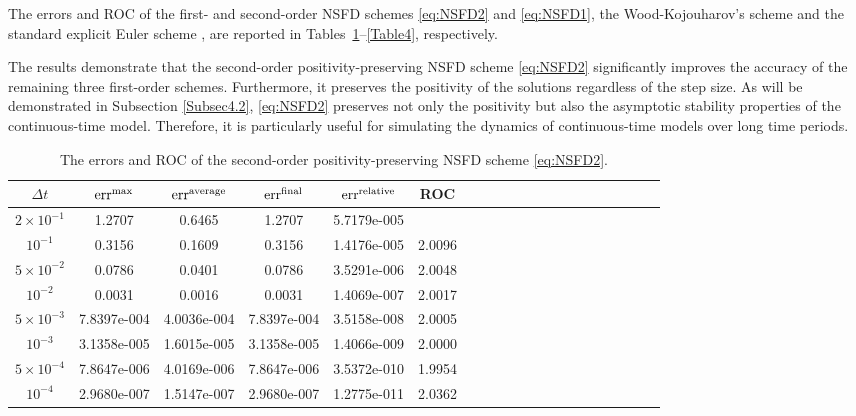 \documentclass[11pt]{article}
\theoremstyle{definition}
\theoremstyle{remark}
\numberwithin{equation}{section}
\DeclareMathOperator{\err}{err}
\begin{document}
The errors and ROC of the first- and second-order NSFD schemes \eqref{eq:NSFD2} and \eqref{eq:NSFD1}, the Wood-Kojouharov's scheme \cite{Wood1} and the standard explicit Euler scheme \cite{Ascher, Stuart}, are reported in Tables~\ref{Table1}--\ref{Table4}, respectively.

The results demonstrate that the second-order positivity-preserving NSFD scheme \eqref{eq:NSFD2} significantly improves the accuracy of the remaining three first-order schemes. 
Furthermore, it preserves the positivity of the solutions regardless of the step size. 
As will be demonstrated in Subsection \ref{Subsec4.2}, \eqref{eq:NSFD2} preserves not only the positivity but also the asymptotic stability properties of the continuous-time model. 
Therefore, it is particularly useful for simulating the dynamics of continuous-time models over long time periods.
\begin{table}[htb]
\centering
\caption{The errors and ROC of the second-order positivity-preserving NSFD scheme \eqref{eq:NSFD2}.}\label{Table1}
\begin{tabular}{cccccccccccccccccccc}
\hline
$\Delta t$ & $\err^{\rm max}$ & $\err^{\rm average}$ & $\err^{\rm final}$ & $\err^{\rm relative}$ & ROC \\
\hline
$2 \times 10^{-1}$ & 1.2707 & 0.6465 & 1.2707 & 5.7179e-005 &\\
$10^{-1}$& 0.3156 & 0.1609 & 0.3156 & 1.4176e-005 & 2.0096\\
$5 \times 10^{-2} $ & 0.0786 &  0.0401 & 0.0786 & 3.5291e-006 & 2.0048 \\
$10^{-2}$ & 0.0031 &  0.0016 & 0.0031 & 1.4069e-007 & 2.0017\\
$5 \times 10^{-3}$ & 7.8397e-004 & 4.0036e-004 & 7.8397e-004 & 3.5158e-008 & 2.0005 \\
$10^{-3}$ & 3.1358e-005 & 1.6015e-005 & 3.1358e-005 &  1.4066e-009 & 2.0000\\
$5 \times 10^{-4}$ &  7.8647e-006 & 4.0169e-006 & 7.8647e-006 & 3.5372e-010 & 1.9954\\
$10^{-4}$ & 2.9680e-007 & 1.5147e-007 & 2.9680e-007 &  1.2775e-011 & 2.0362\\
\hline
\end{tabular}
\end{table}
\end{document}
